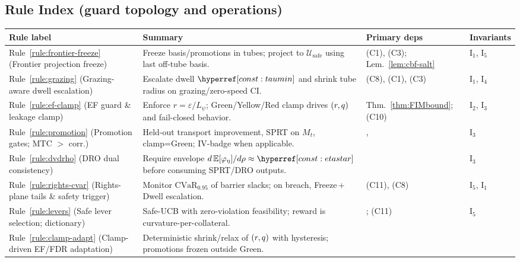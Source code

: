 \subsection{Rule Index (guard topology and operations)}\label{app:resolution-rules}
\emph{}
\begin{table}[h]
\centering
\renewcommand{\arraystretch}{1.12}
\begin{tabularx}{\textwidth}{@{}>{\raggedright\arraybackslash}p{2.75cm} >{\raggedright\arraybackslash}X >{\raggedright\arraybackslash}p{2.1cm} >{\raggedright\arraybackslash}p{1.6cm}@{}}
\toprule
\textbf{Rule label} & \textbf{Summary} & \textbf{Primary deps} & \textbf{Invariants} \\
\midrule
Rule~\ref{rule:frontier-freeze} (Frontier projection freeze) &
Freeze basis/promotions in tubes; project to $\mathcal U_{\mathrm{safe}}$ using last off-tube basis. &
(C1), (C3); Lem.~\ref{lem:cbf-salt} &
I\(_1\), I\(_5\) \\
\addlinespace
Rule~\ref{rule:grazing} (Grazing-aware dwell escalation) &
Escalate dwell $\constref{taumin}$ and shrink tube radius on grazing/zero-speed CI. &
(C8), (C1), (C3) &
I\(_1\), I\(_4\) \\
\addlinespace
Rule~\ref{rule:ef-clamp} (EF guard \& leakage clamp) &
Enforce $r=\varepsilon/L_\psi$; Green/Yellow/Red clamp drives $(r,q)$ and fail-closed behavior. &
Thm.~\ref{thm:FIMbound}; (C10) &
I\(_2\), I\(_3\) \\
\addlinespace
Rule~\ref{rule:promotion} (Promotion gates; MTC $>$ corr.) &
Held-out transport improvement, SPRT on $M_t$, clamp=Green; IV-badge when applicable. &
\jsgiiDef{\lblMTC}, \jsgiiDef{\lblIVbadge} &
I\(_3\) \\
\addlinespace
Rule~\ref{rule:dvdrho} (DRO dual consistency) &
Require envelope $d\,\mathbb E[\varphi_\eta]/d\rho\approx \constref{etastar}$ before consuming SPRT/DRO outputs. &
\jsgiiThm{\lblDROenv} &
I\(_3\) \\
\addlinespace
Rule~\ref{rule:rights-cvar} (Rights-plane tails \& safety trigger) &
Monitor $\mathrm{CVaR}_{0.95}$ of barrier slacks; on breach, Freeze\,+\,Dwell escalation. &
(C11), (C8) &
I\(_5\), I\(_1\) \\
\addlinespace
Rule~\ref{rule:levers} (Safe lever selection; dictionary) &
Safe-UCB with zero-violation feasibility; reward is curvature-per-collateral. &
\jsgiThm{\lblISS}; (C11) &
I\(_5\) \\
\addlinespace
Rule~\ref{rule:clamp-adapt} (Clamp-driven EF/FDR adaptation) &
Deterministic shrink/relax of $(r,q)$ with hysteresis; promotions frozen outside Green. &

\end{tabularx}
\end{table}
